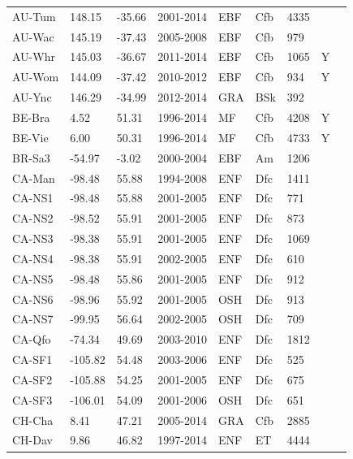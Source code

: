 \documentclass{myreport}
\begin{document}
\begin{longtable}{lllllllll}
  AU-Tum & 148.15 & -35.66 & 2001-2014 & EBF & Cfb & 4335 &  & \cite{AU-Tum} \\ 
  AU-Wac & 145.19 & -37.43 & 2005-2008 & EBF & Cfb & 979 &  & \cite{AU-Wac} \\ 
  AU-Whr & 145.03 & -36.67 & 2011-2014 & EBF & Cfb & 1065 & Y & \cite{AU-Whr} \\ 
  AU-Wom & 144.09 & -37.42 & 2010-2012 & EBF & Cfb & 934 & Y & \cite{AU-Wom} \\ 
  AU-Ync & 146.29 & -34.99 & 2012-2014 & GRA & BSk & 392 &  & \cite{AU-Ync} \\ 
  BE-Bra & 4.52 & 51.31 & 1996-2014 & MF & Cfb & 4208 & Y & \cite{BE-Bra} \\ 
  BE-Vie & 6.00 & 50.31 & 1996-2014 & MF & Cfb & 4733 & Y & \cite{BE-Vie} \\ 
  BR-Sa3 & -54.97 & -3.02 & 2000-2004 & EBF & Am & 1206 &  & \cite{BR-Sa3} \\ 
  CA-Man & -98.48 & 55.88 & 1994-2008 & ENF & Dfc & 1411 &  & \cite{CA-Man} \\ 
  CA-NS1 & -98.48 & 55.88 & 2001-2005 & ENF & Dfc & 771 &  & \cite{CA-NS1} \\ 
  CA-NS2 & -98.52 & 55.91 & 2001-2005 & ENF & Dfc & 873 &  & \cite{CA-NS2} \\ 
  CA-NS3 & -98.38 & 55.91 & 2001-2005 & ENF & Dfc & 1069 &  & \cite{CA-NS3} \\ 
  CA-NS4 & -98.38 & 55.91 & 2002-2005 & ENF & Dfc & 610 &  & \cite{CA-NS4} \\ 
  CA-NS5 & -98.48 & 55.86 & 2001-2005 & ENF & Dfc & 912 &  & \cite{CA-NS5} \\ 
  CA-NS6 & -98.96 & 55.92 & 2001-2005 & OSH & Dfc & 913 &  & \cite{CA-NS6} \\ 
  CA-NS7 & -99.95 & 56.64 & 2002-2005 & OSH & Dfc & 709 &  & \cite{CA-NS7} \\ 
  CA-Qfo & -74.34 & 49.69 & 2003-2010 & ENF & Dfc & 1812 &  & \cite{CA-Qfo} \\ 
  CA-SF1 & -105.82 & 54.48 & 2003-2006 & ENF & Dfc & 525 &  & \cite{CA-SF1} \\ 
  CA-SF2 & -105.88 & 54.25 & 2001-2005 & ENF & Dfc & 675 &  & \cite{CA-SF2} \\ 
  CA-SF3 & -106.01 & 54.09 & 2001-2006 & OSH & Dfc & 651 &  & \cite{CA-SF3} \\ 
  CH-Cha & 8.41 & 47.21 & 2005-2014 & GRA & Cfb & 2885 &  & \cite{CH-Cha} \\ 
  CH-Dav & 9.86 & 46.82 & 1997-2014 & ENF & ET & 4444 &  & \cite{CH-Dav} \\ 

\end{longtable}
\end{document}
